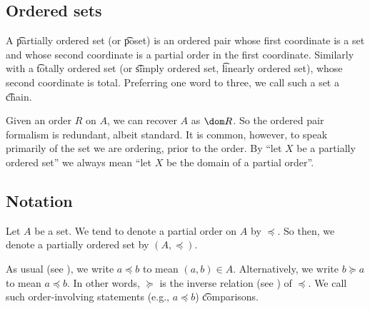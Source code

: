 
\subsection*{Ordered sets}

A \t{partially ordered set} (or \t{poset}) is an ordered pair whose first coordinate is a set and whose second coordinate is a partial order in the first coordinate.
Similarly with a \t{totally ordered set} (or \t{simply ordered set}, \t{linearly ordered set}), whose second coordinate is total.
Preferring one word to three, we call such a set a \t{chain}.

Given an order $R$ on $A$, we can recover $A$ as $\dom R$.
So the ordered pair formalism is redundant, albeit standard.
It is common, however, to speak primarily of the set we are ordering, prior to the order.
By ``let $X$ be a partially ordered set'' we always mean ``let $X$ be the domain of a partial order''.

\subsection*{Notation}

Let $A$ be a set.
We tend to denote a partial order on $A$ by $\preceq$.
So then, we denote a partially ordered set by $(A, \preceq)$.

As usual (see ), we write $a \preceq b$ to mean $(a, b) \in A$.
Alternatively, we write $b \succeq a$ to mean $a \preceq b$.
In other words, $\succeq$ is the inverse relation (see ) of $\preceq$.
We call such order-involving statements (e.g., $a \preceq b$) \t{comparisons}.

